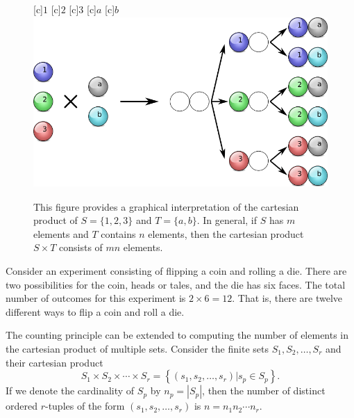 \begin{figure}[htb!]
\begin{center}
\begin{psfrags}
[c]{$1$}
[c]{$2$}
[c]{$3$}
[c]{$a$}
[c]{$b$}
\includegraphics[height=6.495cm]{Figures/4Chapter/countingprinciple}
\end{psfrags}
\caption{This figure provides a graphical interpretation of the cartesian product of $S = \{ 1, 2, 3 \}$ and $T = \{ a, b \}$.
In general, if $S$ has $m$ elements and $T$ contains $n$ elements, then the cartesian product $S \times T$ consists of $m n$ elements.}
\label{figure:CountingPrinciple}
\end{center}
\end{figure}

\begin{example}
Consider an experiment consisting of flipping a coin and rolling a die.
There are two possibilities for the coin, heads or tales, and the die has six faces.
The total number of outcomes for this experiment is $2 \times 6 = 12$.
That is, there are twelve different ways to flip a coin and roll a die.
\end{example}

The counting principle can be extended to computing the number of elements in the cartesian product of multiple sets.
Consider the finite sets $S_1, S_2, \ldots, S_r$ and their cartesian product
\begin{equation*}
S_1 \times S_2 \times \cdots \times S_r
= \left\{ (s_1, s_2, \ldots, s_r) | s_p \in S_p \right\} .
\end{equation*}
If we denote the cardinality of $S_p$ by $n_p = | S_p |$, then the number of distinct ordered $r$-tuples of the form $(s_1, s_2, \ldots, s_r)$ is $n = n_1 n_2 \cdots n_r$.

